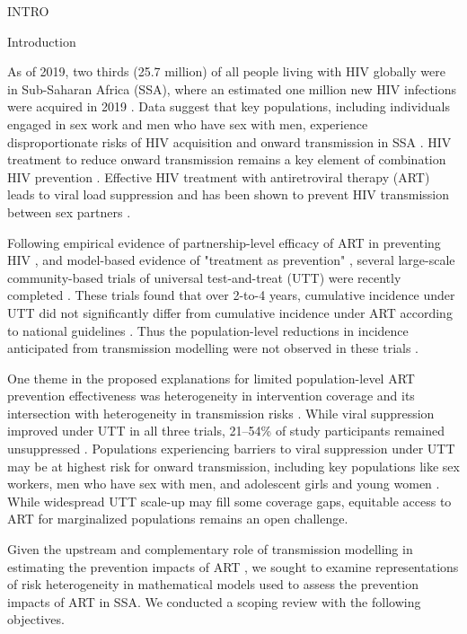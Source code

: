 

INTRO

Introduction

As of 2019, two thirds (25.7 million) of all people living with HIV globally
were in Sub-Saharan Africa (SSA), where
an estimated one million new HIV infections were acquired in 2019 \cite{AIDSinfo}.
Data suggest that key populations, including individuals engaged in sex work and men who have sex with men,
experience disproportionate risks of HIV acquisition and onward transmission in SSA
\cite{Baral2012,Beyrer2012,Mishra2012,Boily2015}.
HIV treatment to reduce onward transmission remains a key element of combination HIV prevention \cite{WHO2016ART}.
Effective HIV treatment with antiretroviral therapy (ART) leads to viral load suppression
and has been shown to prevent HIV transmission between sex partners \cite{Lundgren2015,Danel2015,Cohen2016}.

Following empirical evidence of partnership-level efficacy of ART
in preventing HIV \cite{Lundgren2015,Danel2015,Cohen2016},
and model-based evidence of "treatment as prevention" \cite{Granich2009,Eaton2012,Cori2014},
several large-scale community-based trials of universal test-and-treat (UTT)
were recently completed \cite{Iwuji2018,Havlir2019,Hayes2019}.
These trials found that over 2-to-4 years,
cumulative incidence under UTT did not significantly differ from
cumulative incidence under ART according to national guidelines \cite{Havlir2019,Hayes2019,Iwuji2018}.
Thus the population-level reductions in incidence anticipated from transmission modelling
were not observed in these trials \cite{Baral2019,Havlir2020}.

One theme in the proposed explanations for limited population-level ART prevention effectiveness
was heterogeneity in intervention coverage and its intersection with
heterogeneity in transmission risks \cite{AbdoolKarim2019,Baral2019}.
While viral suppression improved under UTT in all three trials,
21--54\% of study participants remained unsuppressed \cite{Iwuji2018,Havlir2019,Hayes2019}.
Populations experiencing barriers to viral suppression under UTT
may be at highest risk for onward transmission, including key populations like
sex workers, men who have sex with men, and adolescent girls and young women
\cite{Hakim2018,Nyato2019,Green2020}.
While widespread UTT scale-up may fill some coverage gaps,
equitable access to ART for marginalized populations remains an open challenge.

Given the upstream and complementary role of transmission modelling
in estimating the prevention impacts of ART \cite{Eaton2012,Delva2012},
we sought to examine representations of risk heterogeneity
in mathematical models used to assess the prevention impacts of ART in SSA.
We conducted a scoping review with the following objectives.

